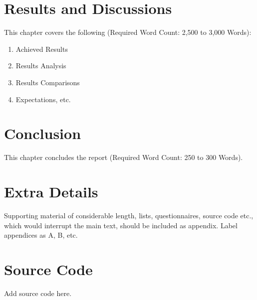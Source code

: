 \documentclass[12pt, openany]{report}
\begin{document}
\chapter{Results and Discussions}
This chapter covers the following (Required Word Count: 2,500 to 3,000 Words):

\begin{enumerate}
    \item Achieved Results
    \item Results Analysis
    \item Results Comparisons
    \item Expectations, etc.
\end{enumerate}

\chapter{Conclusion}
This chapter concludes the report (Required Word Count: 250 to 300 Words).

\begin{appendices}
\chapter{Extra Details}
Supporting material of considerable length, lists, questionnaires, source code etc., which would interrupt the main text, should be included as appendix. Label appendices as A, B, etc.

\chapter{Source Code}
Add source code here.
\end{appendices}



\end{document}
